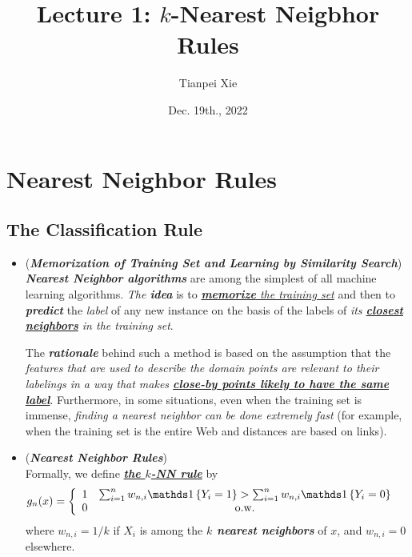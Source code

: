 \documentclass[11pt]{article}
\begin{document}
\title{Lecture 1: $k$-Nearest Neigbhor Rules}
\author{ Tianpei Xie}
\date{ Dec. 19th., 2022 }
\maketitle
\tableofcontents
\newpage
\section{Nearest Neighbor Rules}
\subsection{The Classification Rule}
\begin{itemize}
\item \begin{remark} (\emph{\textbf{Memorization of Training Set and Learning by Similarity Search}})\\
\emph{\textbf{Nearest Neighbor algorithms}} are among the simplest of all machine learning algorithms.  \emph{The \textbf{idea}} is to \underline{\emph{\textbf{memorize} the training set}} and then to \emph{\textbf{predict}} the \emph{label} of any new instance on the basis of the labels of \emph{its \underline{\textbf{closest neighbors}} in the training set}. 

The \emph{\textbf{rationale}} behind such a method is based on the assumption that the \emph{features that are used to describe the domain points are relevant to their labelings in a way that makes \textbf{\underline{close-by points likely to have the same label}}}. Furthermore, in some situations, even when the training set is immense, \emph{finding a nearest neighbor can be done extremely fast} (for example, when the training set is the entire Web and distances are based on links).
\end{remark}


\item \begin{definition} (\emph{\textbf{Nearest Neighbor Rules}})\\
Formally, we define \underline{\emph{\textbf{the $k$-NN rule}}} by
\begin{align*}
g_n(x) &= \left\{\begin{array}{cc}
1 & \sum_{i=1}^{n}w_{n,i}\ind{Y_i = 1} > \sum_{i=1}^{n}w_{n,i}\ind{Y_i = 0}\\
0 & \text{o.w.}
\end{array}
\right.
\end{align*} where $w_{n,i} = 1/ k$ if $X_i$ is among the \emph{\textbf{$k$ nearest neighbors}} of $x$, and $w_{n,i} = 0$ elsewhere. 


\end{definition}
\end{itemize}
\end{document}
